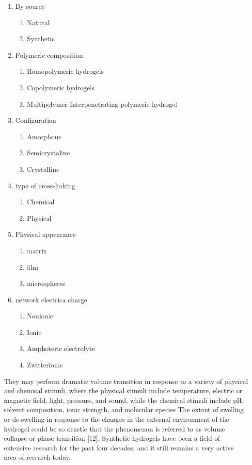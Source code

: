\documentclass[../../main-notes.tex]{subfiles}
\begin{document}
\begin{enumerate}
    \item By source 
    \begin{enumerate}
        \item Natural
        \item Synthetic
    \end{enumerate}
    \item Polymeric composition
    \begin{enumerate}
        \item Homopolymeric hydrogels 
        \item Copolymeric hydrogels 
        \item Multipolymer Interpenetrating polymeric hydrogel 
    \end{enumerate}
    \item Configuration
    \begin{enumerate}
        \item Amorphous
        \item Semicrystaline 
        \item  Crystalline
    \end{enumerate}
    \item type of cross-linking 
    \begin{enumerate}
        \item Chemical
        \item Physical
    \end{enumerate}
    \item Physical appearance
    \begin{enumerate}
        \item matrix
        \item film
        \item microspheres
    \end{enumerate}
    \item network electrica charge
    \begin{enumerate}
        \item Nonionic
        \item Ionic
        \item Amphoteric electrolyte
        \item Zwitterionic
    \end{enumerate}
\end{enumerate}


They may perform dramatic volume transition in response to a variety of physical and chemical stimuli, where the physical stimuli include temperature, electric or magnetic field, light, pressure, and sound, while the chemical stimuli include pH, solvent composition, ionic strength, and molecular species
The extent of swelling or de-swelling in response to the changes in the external environment of the hydrogel could be so drastic that the phenomenon is referred to as volume collapse or phase transition [12]. Synthetic hydrogels have been a field of extensive research for the past four decades, and it still remains a very active area of research today.
\end{document}
